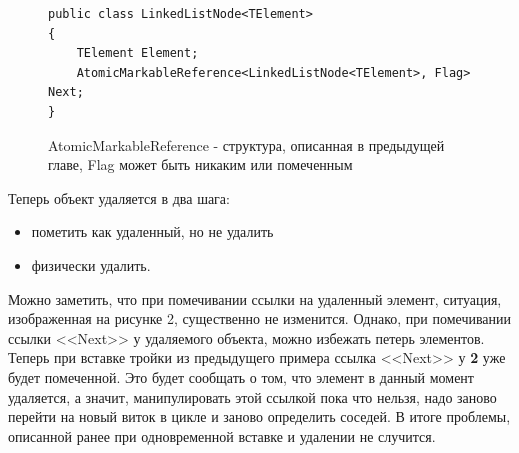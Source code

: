 \documentclass[12pt]{article}
\begin{document}
{\begin{figure}[h]
\begin{lstlisting}
public class LinkedListNode<TElement>
{
	TElement Element;
	AtomicMarkableReference<LinkedListNode<TElement>, Flag> Next;
}
					\end{lstlisting}
					\caption{AtomicMarkableReference - структура, описанная в предыдущей главе, Flag может быть никаким или помеченным}
				\end{figure}
				\par Теперь объект удаляется в два шага: 
				\begin{itemize}
					\item пометить как удаленный, но не удалить
					\item физически удалить. 
				\end{itemize}
				Можно заметить, что при помечивании ссылки на удаленный элемент, ситуация, изображенная на рисунке 2, существенно не изменится. Однако, при помечивании ссылки <<Next>> у удаляемого объекта, можно избежать петерь элементов. Теперь при вставке тройки из предыдущего примера ссылка <<Next>> у \textbf{2} уже будет помеченной. Это будет сообщать о том, что элемент в данный момент удаляется, а значит, манипулировать этой ссылкой пока что нельзя, надо заново перейти на новый виток в цикле и заново определить соседей. В итоге проблемы, описанной ранее при одновременной вставке и удалении не случится.
}
\end{document}
